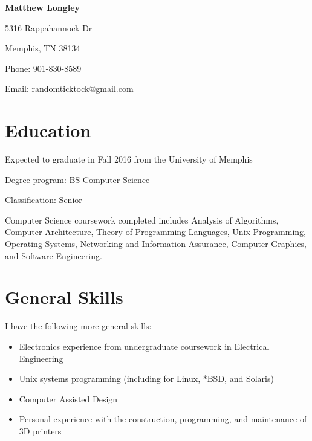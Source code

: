 \documentclass{article}
\begin{document}
\begin{singlespace}
\begin{center}
  \textbf{Matthew Longley}
  
  5316 Rappahannock Dr
  
  Memphis, TN 38134
  
  Phone: 901-830-8589
  
  Email: randomticktock@gmail.com
\end{center}
\begin{flushleft}
  \section*{Education}
  Expected to graduate in Fall 2016 from the University of Memphis

  Degree program: BS Computer Science

  Classification: Senior

  Computer Science coursework completed includes Analysis of Algorithms, Computer Architecture, Theory of Programming Languages, Unix Programming, Operating Systems, Networking and Information Assurance, Computer Graphics, and Software Engineering.
  \section*{General Skills}
  I have the following more general skills:
  \begin{itemize}
  \item Electronics experience from undergraduate coursework in Electrical Engineering
  \item Unix systems programming (including for Linux, *BSD, and Solaris)
  \item Computer Assisted Design
  \item Personal experience with the construction, programming, and maintenance of 3D printers
  \end{itemize}

\end{flushleft}
\end{singlespace}
\end{document}
